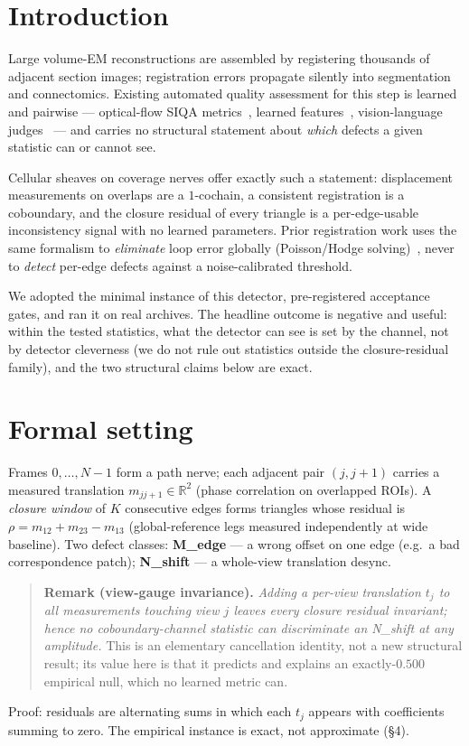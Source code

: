 \documentclass[10pt]{article}
\begin{document}
\section{Introduction}
Large volume-EM reconstructions are assembled by registering thousands of adjacent section images; registration errors propagate silently into segmentation and connectomics. Existing automated quality assessment for this step is learned and pairwise --- optical-flow SIQA metrics~\cite{emsiqa,demis}, learned features~\cite{jsee26}, vision-language judges~\cite{savior} --- and carries no structural statement about \emph{which} defects a given statistic can or cannot see.

Cellular sheaves on coverage nerves offer exactly such a statement: displacement measurements on overlaps are a $1$-cochain, a consistent registration is a coboundary, and the closure residual of every triangle is a per-edge-usable inconsistency signal with no learned parameters. Prior registration work uses the same formalism to \emph{eliminate} loop error globally (Poisson/Hodge solving)~\cite{carlino22}, never to \emph{detect} per-edge defects against a noise-calibrated threshold.

We adopted the minimal instance of this detector, pre-registered acceptance gates, and ran it on real archives. The headline outcome is negative and useful: within the tested statistics, what the detector can see is set by the channel, not by detector cleverness (we do not rule out statistics outside the closure-residual family), and the two structural claims below are exact.

\section{Formal setting}
Frames $0,\dots,N{-}1$ form a path nerve; each adjacent pair $(j,j{+}1)$ carries a measured translation $m_{jj+1}\in\mathbb{R}^2$ (phase correlation on overlapped ROIs). A \emph{closure window} of $K$ consecutive edges forms triangles whose residual is $\rho=m_{12}+m_{23}-m_{13}$ (global-reference legs measured independently at wide baseline). Two defect classes:
\textbf{M\_edge} --- a wrong offset on one edge (e.g.\ a bad correspondence patch);
\textbf{N\_shift} --- a whole-view translation desync.

\begin{quote}
\textbf{Remark (view-gauge invariance).} \emph{Adding a per-view translation $t_j$ to all measurements touching view $j$ leaves every closure residual invariant; hence no coboundary-channel statistic can discriminate an N\_shift at any amplitude.} This is an elementary cancellation identity, not a new structural result; its value here is that it predicts and explains an exactly-$0.500$ empirical null, which no learned metric can.
\end{quote}
\noindent Proof: residuals are alternating sums in which each $t_j$ appears with coefficients summing to zero. The empirical instance is exact, not approximate (\S4).
\end{document}
